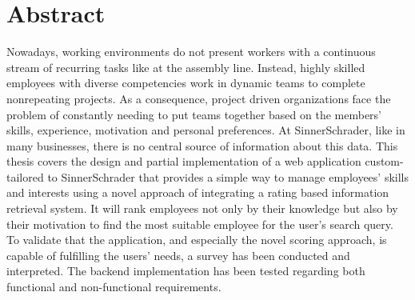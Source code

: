 \chapter{Abstract}
Nowadays, working environments do not present workers with a continuous stream of recurring tasks like at the assembly line. Instead, highly skilled employees with diverse competencies work in dynamic teams to complete nonrepeating projects.
As a consequence, project driven organizations face the problem of constantly needing to put teams together based on the members’ skills, experience, motivation and personal preferences. At SinnerSchrader, like in many businesses, there is no central source of information about this data.
This thesis covers the design and partial implementation of a web application custom-tailored to SinnerSchrader that provides a simple way to manage employees' skills and interests using a novel approach of integrating a rating based information retrieval system. It will rank employees not only by their knowledge but also by their motivation to find the most suitable employee for the user's search query.
To validate that the application, and especially the novel scoring approach, is capable of fulfilling the users’ needs, a survey has been conducted and interpreted. The backend implementation has been tested regarding both functional and non-functional requirements.
